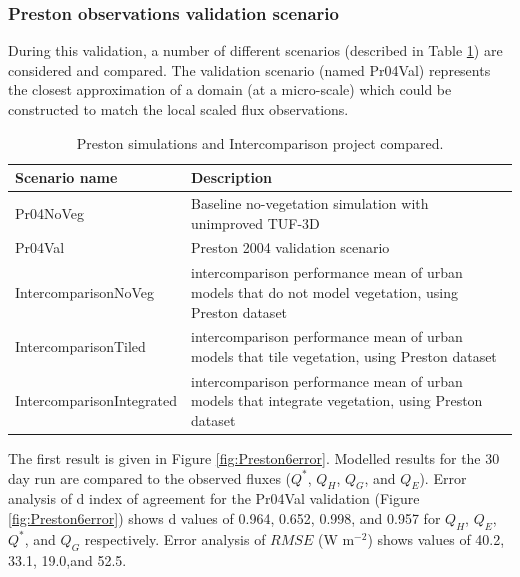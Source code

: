 \documentclass[final,3p,times,authoryear]{elsarticle}
\begin{document}
\subsubsection{Preston observations validation scenario}\label{sec:prvalresults}

During this validation, a number of different scenarios (described in Table \ref{tab:simscompared}) are considered and compared. The validation scenario (named Pr04Val) represents the closest approximation of a domain (at a micro-scale) which could be constructed to match the local scaled flux observations. 

\begin{center}
\begin{table}[!htbp]
\caption{Preston simulations and Intercomparison project compared.\label{tab:simscompared}} 
\begin{tabular}{  | p{0.30\linewidth} | p{0.70\linewidth} |  } 
\hline \textbf{Scenario name} & \textbf{Description}  \\ \hline
Pr04NoVeg & Baseline no-vegetation simulation with unimproved TUF-3D    \\ \hline
Pr04Val & Preston 2004 validation scenario  \\ \hline	
IntercomparisonNoVeg & \cite{Best2012} intercomparison performance mean of urban models that do not model vegetation, using \cite{Coutts2007} Preston dataset  \\ \hline
IntercomparisonTiled & \cite{Best2012} intercomparison performance mean of urban models that tile vegetation, using \cite{Coutts2007} Preston dataset  \\ \hline
IntercomparisonIntegrated & \cite{Best2012} intercomparison performance mean of urban models that integrate vegetation, using \cite{Coutts2007} Preston dataset  \\ \hline
  \end{tabular} 
\end{table}
\end{center}  

The first result is given in Figure \ref{fig:Preston6error}. Modelled results for the 30 day run are compared to the observed fluxes ($Q^{*}$, $Q_{H}$, $Q_{G}$, and $Q_{E}$). Error analysis of d index of agreement for the Pr04Val validation (Figure \ref{fig:Preston6error}) shows d values of 0.964, 0.652, 0.998, and 0.957 for $Q_{H}$, $Q_{E}$, $Q^{*}$, and $Q_{G}$ respectively. Error analysis of $RMSE$ (W m$^{-2}$) shows values of 40.2, 33.1, 19.0,and 52.5. 
\end{document}
